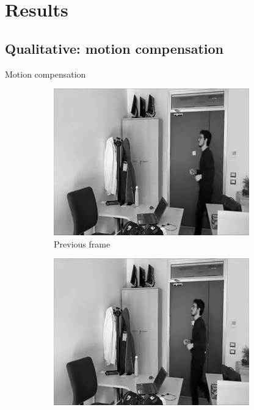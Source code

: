 \documentclass[aspectratio=1610,xcolor=dvipsnames]{beamer}
\begin{document}
\section{Results}
\subsection{Qualitative: motion compensation}
\begin{frame}{Motion compensation}
    \begin{figure}[htbp]
        \begin{subfigure}[b]{0.3\textwidth}
            \centering
            \includegraphics[width=.9\textwidth]{images/pan240-prev-frame.png}
            \caption{Previous frame}
            \label{fig:pan240-prev-frame}
        \end{subfigure}
        \hfill
        \begin{subfigure}[b]{0.3\textwidth}
            \includegraphics[width=.9\textwidth]{images/pan240-curr-frame.png}

\end{subfigure}
\end{figure}
\end{frame}
\end{document}
